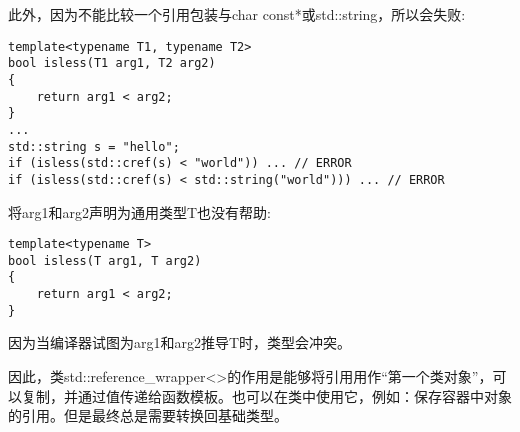此外，因为不能比较一个引用包装与char const*或std::string，所以会失败:

\begin{lstlisting}[style=styleCXX]
template<typename T1, typename T2>
bool isless(T1 arg1, T2 arg2)
{
	return arg1 < arg2;
}
...
std::string s = "hello";
if (isless(std::cref(s) < "world")) ... // ERROR
if (isless(std::cref(s) < std::string("world"))) ... // ERROR
\end{lstlisting}

将arg1和arg2声明为通用类型T也没有帮助:

\begin{lstlisting}[style=styleCXX]
template<typename T>
bool isless(T arg1, T arg2)
{
	return arg1 < arg2;
}
\end{lstlisting}

因为当编译器试图为arg1和arg2推导T时，类型会冲突。

因此，类std::reference\_wrapper<>的作用是能够将引用用作“第一个类对象”，可以复制，并通过值传递给函数模板。也可以在类中使用它，例如：保存容器中对象的引用。但是最终总是需要转换回基础类型。











